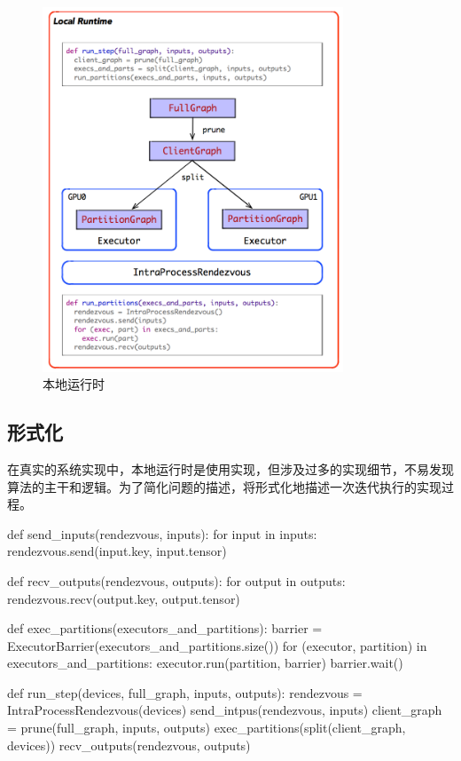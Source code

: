 \begin{content}
\begin{figure}[H]
\centering
\includegraphics[width=0.8\textwidth]{figures/local-runtime.png}
\caption{本地运行时}
 \label{fig:local-runtime}
\end{figure}

\subsection{形式化}

在真实的系统实现中，本地运行时是使用实现，但涉及过多的实现细节，不易发现算法的主干和逻辑。为了简化问题的描述，将形式化地描述一次迭代执行的实现过程。

\begin{leftbar}
\begin{python}
def send_inputs(rendezvous, inputs):
  for input in inputs:
    rendezvous.send(input.key, input.tensor)

def recv_outputs(rendezvous, outputs):
  for output in outputs:
    rendezvous.recv(output.key, output.tensor)

def exec_partitions(executors_and_partitions):
  barrier = ExecutorBarrier(executors_and_partitions.size())
  for (executor, partition) in executors_and_partitions:
    executor.run(partition, barrier)
  barrier.wait()

def run_step(devices, full_graph, inputs, outputs):
  rendezvous = IntraProcessRendezvous(devices)
  send_intpus(rendezvous, inputs)
  client_graph = prune(full_graph, inputs, outputs)
  exec_partitions(split(client_graph, devices))
  recv_outputs(rendezvous, outputs)
\end{python}
\end{leftbar}


\end{content}
